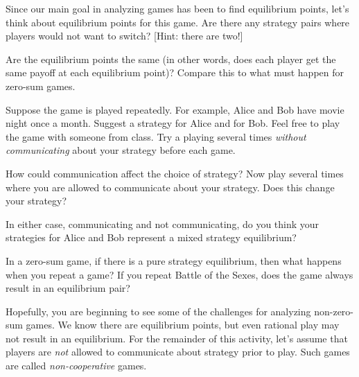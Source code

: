 \begin{xca}\label{E:BoSequilpoints}
Since our main goal in analyzing games has been to find equilibrium points, let's think about equilibrium points for this game. Are there any strategy pairs where players would not want to switch? [Hint: there are two!] 
\end{xca}

\begin{xca}\label{E:BoSunequal}
Are the equilibrium points the same (in other words, does each player get the same payoff at each equilibrium point)? Compare this to what must happen for zero-sum games.
\end{xca}

\begin{xca}\label{E:BoSrepeat}
Suppose the game is played repeatedly. For example, Alice and Bob have movie night once a month. Suggest a strategy for Alice and for Bob.  Feel free to play the game with someone from class. Try a playing several times \emph{without communicating} about your strategy before each game.
\end{xca}

\begin{xca}\label{E:BoScommunication}
How could communication affect the choice of strategy? Now play several times where you are allowed to communicate about your strategy. Does this change your strategy? 
\end{xca}

\begin{xca}\label{E:BoSmixedequil} 
In either case, communicating and not communicating, do you think your strategies for Alice and Bob represent a mixed strategy equilibrium?
\end{xca}

\begin{xca}\label{E:BoScomparezerosum}
In a zero-sum game, if there is a pure strategy equilibrium, then what happens when you repeat a game? If you repeat Battle of the Sexes, does the game always result in an equilibrium pair? 
\end{xca}

Hopefully, you are beginning to see some of the challenges for analyzing non-zero-sum games. We know there are equilibrium points, but even rational play may not result in an equilibrium. For the remainder of this activity, let's assume that players are \emph{not} allowed to communicate about strategy prior to play.  Such games are called \emph{non-cooperative} games.

